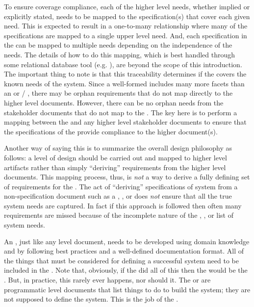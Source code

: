 To ensure coverage compliance, each of the higher level needs, whether implied or explicitly stated, needs to be mapped to the \SPS specification(s) that cover each given need.
This is expected to result in a one-to-many relationship where many of the \SPS specifications are mapped to a single upper level need.
And, each specification in the \SPS can be mapped to multiple needs depending on the independence of the needs.
The details of how to do this mapping, which is best handled through some relational database tool (e.g. \DOORS), are beyond the scope of this introduction.
The important thing to note is that this traceability determines if the \SPS covers the known needs of the system.
Since a well-formed \SPS includes many more facets than an \OCD or \SOW / \SOO, there may be orphan \SPS requirements that do not map directly to the higher level documents.
However, there can be no orphan needs from the stakeholder documents that do not map to the \SPS.
The key here is to perform a mapping between the \SPS and any higher level stakeholder documents to ensure that the specifications of the \SPS provide compliance to the higher document(s).


Another way of saying this is to summarize the overall design philosophy as follows: a level of design should be carried out and mapped to higher level artifacts rather than simply ``deriving'' requirements from the higher level documents.
This mapping process, thus, is {\em not} a way to derive a fully defining set of requirements for the \SPS.
The act of ``deriving'' specifications of system from a non-specification document such as a \OCD, \SOW, or \SOO does {\em not} ensure that all the true system needs are captured.
In fact if this approach is followed then often many requirements are missed because of the incomplete nature of the \OCD, \SOW, or \SOO list of system needs.


An \SPS, just like any level document, needs to be developed using domain knowledge and by following best practices and a well-defined documentation format.
All of the things that must be considered for defining a successful system need to be included in the \SPS.
Note that, obviously, if the \SOW did all of this then the \SOW would be the \SPS.
But, in practice, this rarely ever happens, nor should it.
The \SOW or \SOO are programmatic level documents that list things to do to build the system; they are not supposed to define the system.
This is the job of the \SPS.


